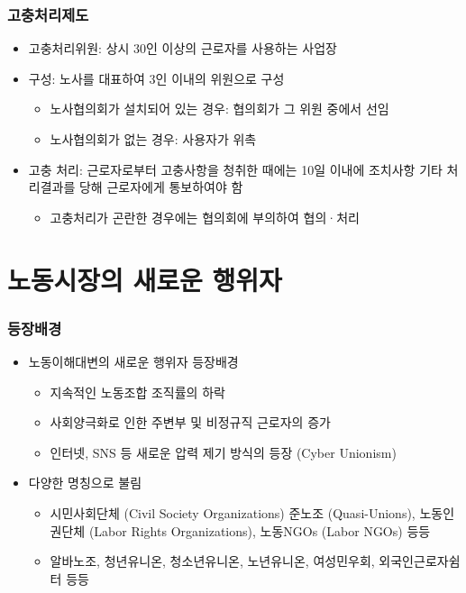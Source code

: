 \documentclass[aspectratio=169,xcolor=dvipsnames,handout]{beamer}
\begin{document}
\begin{frame}
    \frametitle{고충처리제도}
    \begin{itemize}[<+->]
        \item 고충처리위원: 상시 30인 이상의 근로자를 사용하는 사업장
        \item 구성: 노사를 대표하여 3인 이내의 위원으로 구성
        \begin{itemize}
            \item 노사협의회가 설치되어 있는 경우: 협의회가 그 위원 중에서 선임
            \item 노사협의회가 없는 경우: 사용자가 위촉
        \end{itemize}
        \item 고충 처리: 근로자로부터 고충사항을 청취한 때에는 10일 이내에 조치사항 기타 처리결과를 당해 근로자에게 통보하여야 함
        \begin{itemize}
            \item 고충처리가 곤란한 경우에는 협의회에 부의하여 협의·처리
        \end{itemize}
    \end{itemize}
\end{frame}


\section{노동시장의 새로운 행위자}
\begin{frame}
    \frametitle{등장배경}
    \begin{itemize}[<+->]
        \item 노동이해대변의 새로운 행위자 등장배경
        \begin{itemize}
            \item 지속적인 노동조합 조직률의 하락
            \item 사회양극화로 인한 주변부 및 비정규직 근로자의 증가
            \item 인터넷, SNS 등 새로운 압력 제기 방식의 등장 (Cyber Unionism)
        \end{itemize}
        \item 다양한 명칭으로 불림
        \begin{itemize}
            \item 시민사회단체 (Civil Society Organizations) 준노조 (Quasi-Unions), 노동인권단체 (Labor Rights Organizations), 노동NGOs (Labor NGOs) 등등
            \item 알바노조, 청년유니온, 청소년유니온, 노년유니온, 여성민우회, 외국인근로자쉼터 등등 
        \end{itemize}
    \end{itemize}
\end{frame}
\end{document}
